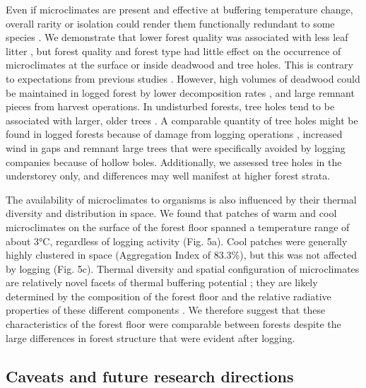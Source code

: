 \documentclass[12pt,a4paper,]{report}
\theoremstyle{definition}
\theoremstyle{definition}
\theoremstyle{definition}
\theoremstyle{remark}
\begin{document}
Even if microclimates are present and effective at buffering temperature
change, overall rarity or isolation could render them functionally
redundant to some species
\citep{sears_world2011, sears_configuration2016}. We demonstrate that
lower forest quality was associated with less leaf litter \citep[Fig. 5;
cf.][]{saner_reduced2009}, but forest quality and forest type had little
effect on the occurrence of microclimates at the surface or inside
deadwood and tree holes. This is contrary to expectations from previous
studies \citep{ball_tree1999, blakely_tree2008}. However, high volumes
of deadwood could be maintained in logged forest by lower decomposition
rates
\citetext{\citealp{ewers_logging2015}; \citealp{yeong_leaf2016}; \citealp[but
see][]{herault_modeling2010}}, and large remnant pieces from harvest
operations. In undisturbed forests, tree holes tend to be associated
with larger, older trees
\citep{lindenmayer_cavity2000, blakely_tree2008}. A comparable quantity
of tree holes might be found in logged forests because of damage from
logging operations \citep{edwards_maintaining2014}, increased wind in
gaps \citep{chen_growing-season1995} and remnant large trees that were
specifically avoided by logging companies because of hollow boles.
Additionally, we assessed tree holes in the understorey only, and
differences may well manifest at higher forest strata.

The availability of microclimates to organisms is also influenced by
their thermal diversity and distribution in space. We found that patches
of warm and cool microclimates on the surface of the forest floor
spanned a temperature range of about 3°C, regardless of logging activity
(Fig. 5a). Cool patches were generally highly clustered in space
(Aggregation Index of 83.3\%), but this was not affected by logging
(Fig. 5c). Thermal diversity and spatial configuration of microclimates
are relatively novel facets of thermal buffering potential \citep[but
see:][]{caillon_warming2014, sears_configuration2016, faye_toolbox2016};
they are likely determined by the composition of the forest floor and
the relative radiative properties of these different components
\citep[e.g.~bare soil versus leaves versus
water;][]{oke_boundary1987, snyder_analyzing2004}. We therefore suggest
that these characteristics of the forest floor were comparable between
forests despite the large differences in forest structure that were
evident after logging.

\subsection{Caveats and future research
directions}\label{caveats-and-future-research-directions}
\end{document}

